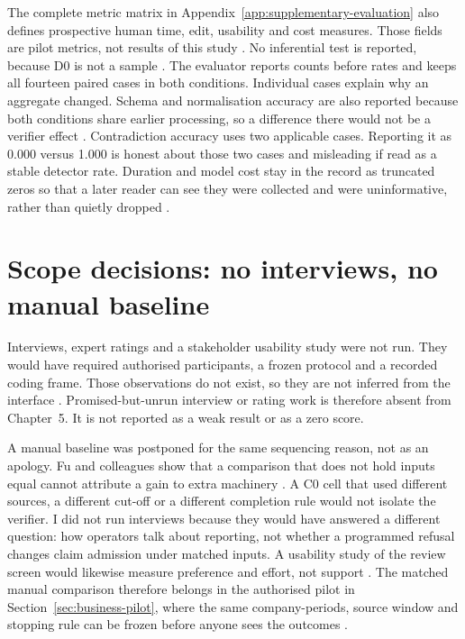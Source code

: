 The complete metric matrix in Appendix~\ref{app:supplementary-evaluation} also defines prospective
human time, edit, usability and cost measures. Those fields are pilot metrics, not results of this
study \citep{nist2023airmf,pineau2021reproducibility}. No inferential test is reported, because
D0 is not a sample \citep{ribeiro2020checklist,kapoor2023leakage}.
The evaluator reports counts before rates and keeps all fourteen paired cases in both conditions.
Individual cases explain why an aggregate changed. Schema and normalisation accuracy are also
reported because both conditions share earlier processing, so a difference there would not be a
verifier effect \citep{gao2023alce,pineau2021reproducibility}. Contradiction accuracy uses two
applicable cases. Reporting it as 0.000 versus 1.000 is honest about those two cases and
misleading if read as a stable detector rate. Duration and model cost stay in the record as
truncated zeros so that a later reader can see they were collected and were uninformative,
rather than quietly dropped \citep{gebru2021datasheets,nikiforova2020quality}.

\section{Scope decisions: no interviews, no manual baseline}
\label{sec:sequencing-unrun}

Interviews, expert ratings and a stakeholder usability study were not run. They would have required
authorised participants, a frozen protocol and a recorded coding frame. Those observations do not
exist, so they are not inferred from the interface
\citep{amershi2019guidelines,bucinca2021forcing}. Promised-but-unrun interview or rating work is
therefore absent from Chapter~5. It is not reported as a weak result or as a zero score.

A manual baseline was postponed for the same sequencing reason, not as an apology. Fu and colleagues
show that a comparison that does not hold inputs equal cannot attribute a gain to extra machinery
\citep{fu2026agents,peffers2007dsrm}. A C0 cell that used different sources, a different cut-off or
a different completion rule would not isolate the verifier. I did not run interviews because they
would have answered a different question: how operators talk about reporting, not whether a
programmed refusal changes claim admission under matched inputs. A usability study of the review
screen would likewise measure preference and effort, not support
\citep{amershi2019guidelines,bucinca2021forcing}. The matched manual comparison therefore belongs
in the authorised pilot in Section~\ref{sec:business-pilot}, where the same company-periods,
source window and stopping rule can be frozen before anyone sees the outcomes
\citep{kapoor2023leakage,pineau2021reproducibility}.

